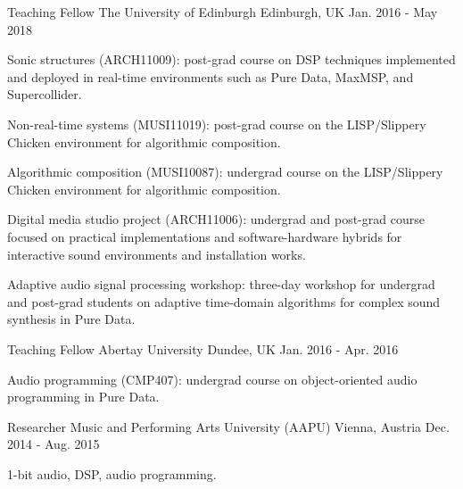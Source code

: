 \begin{cventries}
  \cventry
    {Teaching Fellow} %
    {The University of Edinburgh} %
    {Edinburgh, UK} %
    {Jan. 2016 - May 2018} %
    {
      \begin{cvitems} %
        \item {Sonic structures (ARCH11009): post-grad course on DSP techniques implemented and deployed in real-time environments such as Pure Data, MaxMSP, and Supercollider.}
        \item{Non-real-time systems (MUSI11019): post-grad course on the LISP/Slippery Chicken environment for algorithmic composition.}
        \item{Algorithmic composition (MUSI10087): undergrad course on the LISP/Slippery Chicken environment for algorithmic composition.}
        \item{Digital media studio project (ARCH11006): undergrad and post-grad course focused on practical implementations and software-hardware hybrids for interactive sound environments and installation works.}
        \item{Adaptive audio signal processing workshop: three-day workshop for undergrad and post-grad students on adaptive time-domain algorithms for complex sound synthesis in Pure Data.}
      \end{cvitems}
    }

  \cventry
    {Teaching Fellow} %
    {Abertay University} %
    {Dundee, UK} %
    {Jan. 2016 - Apr. 2016} %
    {
      \begin{cvitems} %
        \item {Audio programming (CMP407): undergrad course on object-oriented audio programming in Pure Data.}
      \end{cvitems}
    }

  \cventry
    {Researcher} %
    {Music and Performing Arts University (AAPU)} %
    {Vienna, Austria} %
    {Dec. 2014 - Aug. 2015} %
    {
      \begin{cvitems} %
        \item {1-bit audio, DSP, audio programming.}
      \end{cvitems}
    }

\end{cventries}
